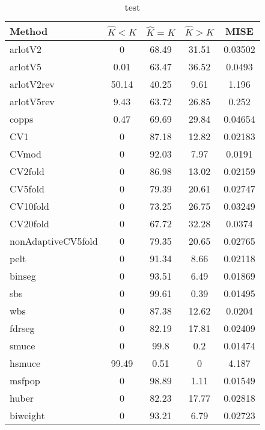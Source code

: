 \begin{table}[ht]
\centering
\begin{tabular}{l|cccc}
  \hline
Method & $\hat{K} < K$ & $\hat{K} = K$ & $\hat{K} > K$ & MISE \\ 
  \hline
arlotV2 &     0 & 68.49 & 31.51 & 0.03502 \\ 
  arlotV5 &  0.01 & 63.47 & 36.52 & 0.0493 \\ 
  arlotV2rev & 50.14 & 40.25 &  9.61 & 1.196 \\ 
  arlotV5rev &  9.43 & 63.72 & 26.85 & 0.252 \\ 
  copps &  0.47 & 69.69 & 29.84 & 0.04654 \\ 
  CV1 &     0 & 87.18 & 12.82 & 0.02183 \\ 
  CVmod &     0 & 92.03 &  7.97 & 0.0191 \\ 
  CV2fold &     0 & 86.98 & 13.02 & 0.02159 \\ 
  CV5fold &     0 & 79.39 & 20.61 & 0.02747 \\ 
  CV10fold &     0 & 73.25 & 26.75 & 0.03249 \\ 
  CV20fold &     0 & 67.72 & 32.28 & 0.0374 \\ 
  nonAdaptiveCV5fold &     0 & 79.35 & 20.65 & 0.02765 \\ 
  pelt &     0 & 91.34 &  8.66 & 0.02118 \\ 
  binseg &     0 & 93.51 &  6.49 & 0.01869 \\ 
  sbs &     0 & 99.61 &  0.39 & 0.01495 \\ 
  wbs &     0 & 87.38 & 12.62 & 0.0204 \\ 
  fdrseg &     0 & 82.19 & 17.81 & 0.02409 \\ 
  smuce &     0 &  99.8 &   0.2 & 0.01474 \\ 
  hsmuce & 99.49 &  0.51 &     0 & 4.187 \\ 
  msfpop &     0 & 98.89 &  1.11 & 0.01549 \\ 
  huber &     0 & 82.23 & 17.77 & 0.02818 \\ 
  biweight &     0 & 93.21 &  6.79 & 0.02723 \\ 
   \hline
\end{tabular}
\caption{test} 
\end{table}
